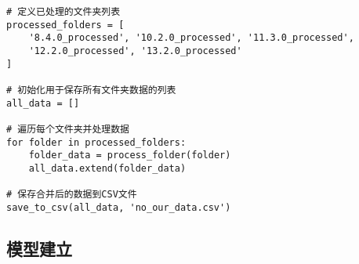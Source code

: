 \begin{lstlisting}
# 定义已处理的文件夹列表
processed_folders = [
    '8.4.0_processed', '10.2.0_processed', '11.3.0_processed',
    '12.2.0_processed', '13.2.0_processed'
]

# 初始化用于保存所有文件夹数据的列表
all_data = []

# 遍历每个文件夹并处理数据
for folder in processed_folders:
    folder_data = process_folder(folder)
    all_data.extend(folder_data)

# 保存合并后的数据到CSV文件
save_to_csv(all_data, 'no_our_data.csv')

\end{lstlisting}
\vspace*{1cm}
\subsection*{模型建立}
